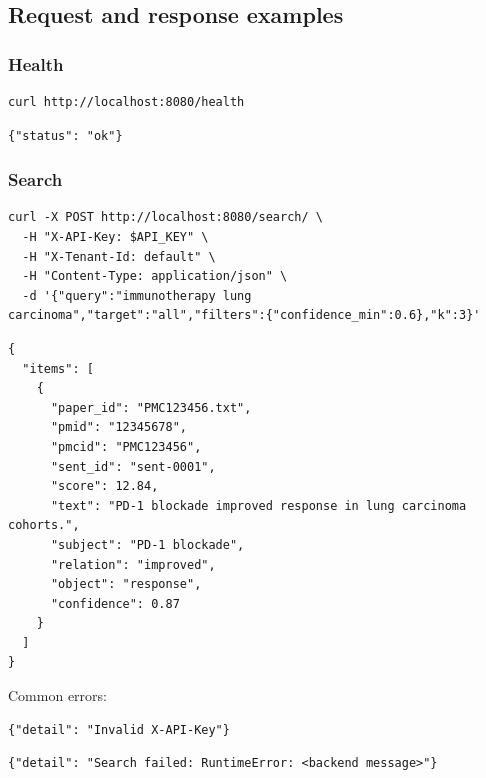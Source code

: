 \documentclass[10pt,letterpaper]{article}
\begin{document}
\subsection{Request and response examples}

\subsubsection{Health}

\begin{Verbatim}[fontsize=\scriptsize,breaklines=true,breakanywhere=true]
curl http://localhost:8080/health
\end{Verbatim}

\begin{Verbatim}[fontsize=\scriptsize,breaklines=true,breakanywhere=true]
{"status": "ok"}
\end{Verbatim}

\subsubsection{Search}

\begin{Verbatim}[fontsize=\scriptsize,breaklines=true,breakanywhere=true]
curl -X POST http://localhost:8080/search/ \
  -H "X-API-Key: $API_KEY" \
  -H "X-Tenant-Id: default" \
  -H "Content-Type: application/json" \
  -d '{"query":"immunotherapy lung carcinoma","target":"all","filters":{"confidence_min":0.6},"k":3}'
\end{Verbatim}

\begin{Verbatim}[fontsize=\scriptsize,breaklines=true,breakanywhere=true]
{
  "items": [
    {
      "paper_id": "PMC123456.txt",
      "pmid": "12345678",
      "pmcid": "PMC123456",
      "sent_id": "sent-0001",
      "score": 12.84,
      "text": "PD-1 blockade improved response in lung carcinoma cohorts.",
      "subject": "PD-1 blockade",
      "relation": "improved",
      "object": "response",
      "confidence": 0.87
    }
  ]
}
\end{Verbatim}

Common errors:

\begin{Verbatim}[fontsize=\scriptsize,breaklines=true,breakanywhere=true]
{"detail": "Invalid X-API-Key"}
\end{Verbatim}

\begin{Verbatim}[fontsize=\scriptsize,breaklines=true,breakanywhere=true]
{"detail": "Search failed: RuntimeError: <backend message>"}
\end{Verbatim}
\end{document}
